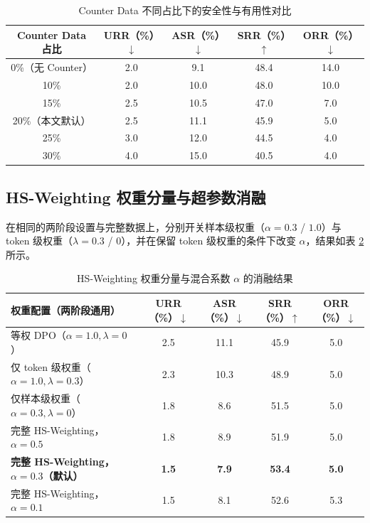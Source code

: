 \documentclass[fontset=fandol,type=master,campus=shenzhen,etitleauto=true]{hithesisbook}
\begin{document}
\begin{table}[htbp]
\centering
\caption{Counter Data 不同占比下的安全性与有用性对比}
\label{tab:counter-ratio}
\small
\renewcommand{\arraystretch}{1.1}
\begin{tabular}{c c c c c}
\toprule
\textbf{Counter Data 占比} & \textbf{URR（\%）$\downarrow$} & \textbf{ASR（\%）$\downarrow$} & \textbf{SRR（\%）$\uparrow$} & \textbf{ORR（\%）$\downarrow$} \\
\midrule
0\%（无 Counter） & 2.0 & 9.1 & 48.4 & 14.0 \\
10\% & 2.0 & 10.0 & 48.0 & 10.0 \\
15\% & 2.5 & 10.5 & 47.0 & 7.0 \\
20\%（本文默认） & 2.5 & 11.1 & 45.9 & 5.0 \\
25\% & 3.0 & 12.0 & 44.5 & 4.0 \\
30\% & 4.0 & 15.0 & 40.5 & 4.0 \\
\bottomrule
\end{tabular}
\end{table}

\subsection{HS-Weighting 权重分量与超参数消融}\label{rtw-results}

在相同的两阶段设置与完整数据上，分别开关样本级权重（$\alpha = 0.3$ / $1.0$）与 token 级权重（$\lambda = 0.3$ / $0$），并在保留 token 级权重的条件下改变 $\alpha$，结果如表 \ref{tab:rtw-results} 所示。

\begin{table}[htbp]
\centering
\caption{HS-Weighting 权重分量与混合系数 $\alpha$ 的消融结果}
\label{tab:rtw-results}
\small
\setlength{\tabcolsep}{4pt}
\renewcommand{\arraystretch}{1.15}
\begin{tabular}{p{5.4cm} c c c c}
\toprule
\textbf{权重配置（两阶段通用）} & \textbf{URR（\%）$\downarrow$} & \textbf{ASR（\%）$\downarrow$} & \textbf{SRR（\%）$\uparrow$} & \textbf{ORR（\%）$\downarrow$} \\
\midrule
等权 DPO（$\alpha=1.0, \lambda=0$） & 2.5 & 11.1 & 45.9 & 5.0 \\
仅 token 级权重（$\alpha=1.0, \lambda=0.3$） & 2.3 & 10.3 & 48.9 & 5.0 \\
仅样本级权重（$\alpha=0.3, \lambda=0$） & 1.8 & 8.6 & 51.5 & 5.0 \\
\midrule
完整 HS-Weighting，$\alpha=0.5$ & 1.8 & 8.9 & 51.9 & 5.0 \\
\textbf{完整 HS-Weighting，$\alpha=0.3$（默认）} & \textbf{1.5} & \textbf{7.9} & \textbf{53.4} & \textbf{5.0} \\
完整 HS-Weighting，$\alpha=0.1$ & 1.5 & 8.1 & 52.6 & 5.3 \\
\bottomrule
\end{tabular}
\end{table}
\end{document}
